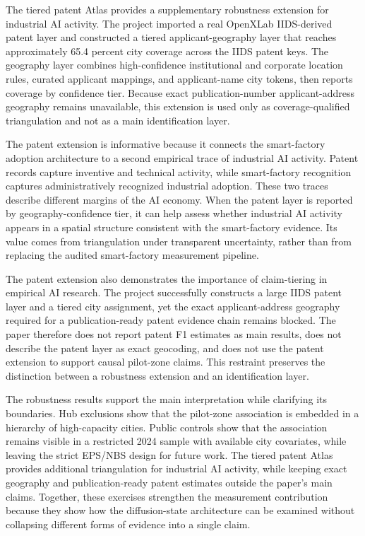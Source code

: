 \documentclass[12pt]{article}
\begin{document}
The tiered patent Atlas provides a supplementary robustness extension for industrial AI activity. The project imported a real OpenXLab IIDS-derived patent layer and constructed a tiered applicant-geography layer that reaches approximately 65.4 percent city coverage across the IIDS patent keys. The geography layer combines high-confidence institutional and corporate location rules, curated applicant mappings, and applicant-name city tokens, then reports coverage by confidence tier. Because exact publication-number applicant-address geography remains unavailable, this extension is used only as coverage-qualified triangulation and not as a main identification layer.

The patent extension is informative because it connects the smart-factory adoption architecture to a second empirical trace of industrial AI activity. Patent records capture inventive and technical activity, while smart-factory recognition captures administratively recognized industrial adoption. These two traces describe different margins of the AI economy. When the patent layer is reported by geography-confidence tier, it can help assess whether industrial AI activity appears in a spatial structure consistent with the smart-factory evidence. Its value comes from triangulation under transparent uncertainty, rather than from replacing the audited smart-factory measurement pipeline.

The patent extension also demonstrates the importance of claim-tiering in empirical AI research. The project successfully constructs a large IIDS patent layer and a tiered city assignment, yet the exact applicant-address geography required for a publication-ready patent evidence chain remains blocked. The paper therefore does not report patent F1 estimates as main results, does not describe the patent layer as exact geocoding, and does not use the patent extension to support causal pilot-zone claims. This restraint preserves the distinction between a robustness extension and an identification layer.

The robustness results support the main interpretation while clarifying its boundaries. Hub exclusions show that the pilot-zone association is embedded in a hierarchy of high-capacity cities. Public controls show that the association remains visible in a restricted 2024 sample with available city covariates, while leaving the strict EPS/NBS design for future work. The tiered patent Atlas provides additional triangulation for industrial AI activity, while keeping exact geography and publication-ready patent estimates outside the paper's main claims. Together, these exercises strengthen the measurement contribution because they show how the diffusion-state architecture can be examined without collapsing different forms of evidence into a single claim.
\end{document}
